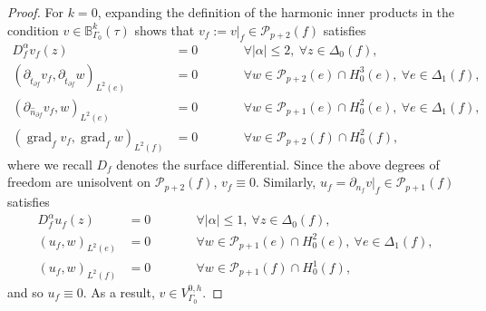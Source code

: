 \documentclass[10pt,a4paper]{amsart}
\newcommand{\unitvec}[1]{\hat{#1}}
\begin{document}
\begin{proof}
	For $k = 0$, expanding the definition of the harmonic inner products
	in the condition $v \in \mathbb{B}_{\Gamma_0}^k(\tau)$ shows that	
	$v_f := v|_{f} \in \mathcal{P}_{p+2}(f)$ satisfies 
	\begin{subequations}
		\label{eq:proof:Pp2-face-dofs}
		\begin{alignat}{2}
			D_f^{\alpha} v_f (z) &= 0 \qquad & &\forall |\alpha| \leq 2, 
			\ \forall z \in \Delta_0(f), \\
			(\partial_{\unitvec{t}_{\partial f}}v_f, \partial_{\unitvec{t}_{\partial f}}w)_{L^2(e)} &= 0 
			\qquad & &\forall w \in \mathcal{P}_{p+2}(e) \cap H^3_0(e), \ 
			\forall e \in \Delta_1(f), \\
			(\partial_{\unitvec{n}_{\partial f}} v_{f}, w )_{L^2(e)} &= 0 
			\qquad & &\forall w \in \mathcal{P}_{p+1}(e) \cap H^2_0(e), \ 
			\forall e \in \Delta_1(f), \\ 
			(\operatorname{grad}_fv_f, \operatorname{grad}_fw)_{L^2(f)} &=0 
			\qquad & &\forall w \in \mathcal{P}_{p+2}(f) \cap H^2_0(f),
		\end{alignat}	
	\end{subequations}
	where we recall $D_f$ denotes the surface differential.
	Since the above degrees of freedom are unisolvent on $\mathcal{P}_{p+2}(f)$,
	$v_{f} \equiv 0$. Similarly, 
	$u_f = \partial_{n_f} v|_f \in \mathcal{P}_{p+1}(f)$ satisfies
	\begin{subequations}
		\label{eq:proof:Pp1-face-dofs}
		\begin{alignat}{2}
			D_f^{\alpha} u_f (z) &= 0 \qquad & &\forall |\alpha| \leq 1, 
			\ \forall z \in \Delta_0(f), \\
			(u_f, w)_{L^2(e)} &= 0 
			\qquad & &\forall w \in \mathcal{P}_{p+1}(e) \cap H^2_0(e), \ 
			\forall e \in \Delta_1(f),  \\
			\label{eq:proof:Pp1-face-dofs-interior-face}
			(u_f, w)_{L^2(f)} &=0 
			\qquad & &\forall w \in \mathcal{P}_{p+1}(f) \cap H^1_0(f),
		\end{alignat}	
	\end{subequations}	
	and so $u_f \equiv 0$. As a result, $v \in V_{\Gamma_0}^{0, h}$.
	

\end{proof}
\end{document}
